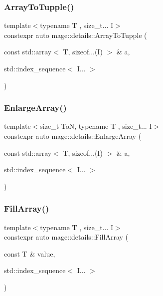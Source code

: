 \subsubsection{\texorpdfstring{Array\+To\+Tupple()}{ArrayToTupple()}}
{\footnotesize\ttfamily template$<$typename T , size\+\_\+t... I$>$ \\
constexpr auto mage\+::details\+::\+Array\+To\+Tupple (\begin{DoxyParamCaption}\item[{const std\+::array$<$ T, sizeof...(I) $>$ \&}]{a,  }\item[{std\+::index\+\_\+sequence$<$ I... $>$}]{ }\end{DoxyParamCaption})\hspace{0.3cm}{\ttfamily [noexcept]}}

\mbox{\label{namespacemage_1_1details_ad83ea78ba7d2cd128388c1364e0d60ea}} 
\subsubsection{\texorpdfstring{Enlarge\+Array()}{EnlargeArray()}}
{\footnotesize\ttfamily template$<$size\+\_\+t ToN, typename T , size\+\_\+t... I$>$ \\
constexpr auto mage\+::details\+::\+Enlarge\+Array (\begin{DoxyParamCaption}\item[{const std\+::array$<$ T, sizeof...(I) $>$ \&}]{a,  }\item[{std\+::index\+\_\+sequence$<$ I... $>$}]{ }\end{DoxyParamCaption})}

\mbox{\label{namespacemage_1_1details_ad477b707ee51319263d0ee265497b19b}} 
\subsubsection{\texorpdfstring{Fill\+Array()}{FillArray()}}
{\footnotesize\ttfamily template$<$typename T , size\+\_\+t... I$>$ \\
constexpr auto mage\+::details\+::\+Fill\+Array (\begin{DoxyParamCaption}\item[{const T \&}]{value,  }\item[{std\+::index\+\_\+sequence$<$ I... $>$}]{ }\end{DoxyParamCaption})}

